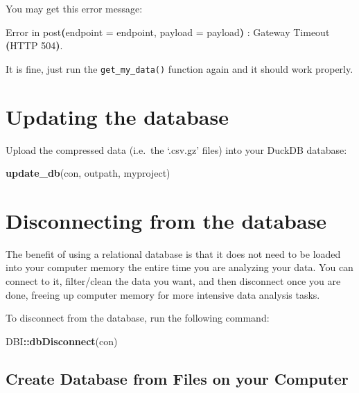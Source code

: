 \documentclass[
]{book}
\newenvironment{Shaded}{\begin{snugshade}}{\end{snugshade}}
\newcommand{\BuiltInTok}[1]{#1}
\newcommand{\ErrorTok}[1]{\textcolor[rgb]{0.64,0.00,0.00}{\textbf{#1}}}
\newcommand{\ExtensionTok}[1]{#1}
\newcommand{\FunctionTok}[1]{\textcolor[rgb]{0.13,0.29,0.53}{\textbf{#1}}}
\newcommand{\KeywordTok}[1]{\textcolor[rgb]{0.13,0.29,0.53}{\textbf{#1}}}
\newcommand{\NormalTok}[1]{#1}
\newcommand{\SpecialCharTok}[1]{\textcolor[rgb]{0.81,0.36,0.00}{\textbf{#1}}}
\begin{document}
You may get this error message:

\begin{Shaded}
\begin{Highlighting}[]
\ExtensionTok{Error}\NormalTok{ in post}\ErrorTok{(}\ExtensionTok{endpoint}\NormalTok{ = endpoint, payload = payload}\KeywordTok{)} \BuiltInTok{:} 
  \ExtensionTok{Gateway}\NormalTok{ Timeout }\ErrorTok{(}\ExtensionTok{HTTP}\NormalTok{ 504}\KeywordTok{)}\BuiltInTok{.}
\end{Highlighting}
\end{Shaded}

It is fine, just run the \texttt{get\_my\_data()} function again and it should work properly.

\section{Updating the database}\label{updating-the-database}

Upload the compressed data (i.e.~the `.csv.gz' files) into your DuckDB database:

\begin{Shaded}
\begin{Highlighting}[]
\FunctionTok{update\_db}\NormalTok{(con, outpath, myproject)}
\end{Highlighting}
\end{Shaded}

\section{Disconnecting from the database}\label{disconnecting-from-the-database}

The benefit of using a relational database is that it does not need to be loaded into your computer memory the entire time you are analyzing your data. You can connect to it, filter/clean the data you want, and then disconnect once you are done, freeing up computer memory for more intensive data analysis tasks.

To disconnect from the database, run the following command:

\begin{Shaded}
\begin{Highlighting}[]
\NormalTok{DBI}\SpecialCharTok{::}\FunctionTok{dbDisconnect}\NormalTok{(con)}
\end{Highlighting}
\end{Shaded}

\subsection{Create Database from Files on your Computer}\label{create-database-from-files-on-your-computer}
\end{document}
